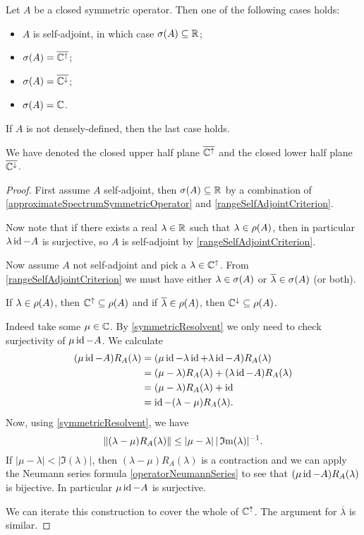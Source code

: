 \begin{proposition}
Let $A$ be a closed symmetric operator. Then one of the following cases holds:
\begin{itemize}
\item $A$ is self-adjoint, in which case $\sigma(A) \subseteq \mathbb{R}$;
\item $\sigma(A) = \overline{\mathbb{C}^{\uparrow}}$;
\item $\sigma(A) = \overline{\mathbb{C}^{\downarrow}}$;
\item $\sigma(A) = \mathbb{C}$.
\end{itemize}
If $A$ is not densely-defined, then the last case holds.
\end{proposition}
We have denoted the closed upper half plane $\overline{\mathbb{C}^{\uparrow}}$ and the closed lower half plane $\overline{\mathbb{C}^{\downarrow}}$.
\begin{proof}
First assume $A$ self-adjoint, then $\sigma(A)\subseteq \mathbb{R}$ by a combination of \ref{approximateSpectrumSymmetricOperator} and \ref{rangeSelfAdjointCriterion}.

Now note that if there exists a real $\lambda\in\mathbb{R}$ such that $\lambda \in \rho(A)$, then in particular $\lambda\operatorname{id} -A$ is surjective, so $A$ is self-adjoint by \ref{rangeSelfAdjointCriterion}.

Now assume $A$ not self-adjoint and pick a $\lambda\in \mathbb{C}^{\uparrow}$. From \ref{rangeSelfAdjointCriterion} we must have either $\lambda\in\sigma(A)$ or $\overline{\lambda}\in\sigma(A)$ (or both).

If $\lambda\in \rho(A)$, then $\mathbb{C}^\uparrow \subseteq \rho(A)$ and if $\overline{\lambda}\in\rho(A)$, then $\mathbb{C}^\downarrow \subseteq \rho(A)$.

Indeed take some $\mu\in\mathbb{C}$.
By \ref{symmetricResolvent} we only need to check surjectivity of $\mu\operatorname{id} - A$. We calculate
\begin{align*}
(\mu\operatorname{id} - A)R_A(\lambda) &= (\mu\operatorname{id} -\lambda\operatorname{id}+\lambda\operatorname{id} - A)R_A(\lambda) \\
&= (\mu-\lambda)R_A(\lambda) + (\lambda\operatorname{id}-A)R_A(\lambda) \\
&= (\mu-\lambda)R_A(\lambda) + \operatorname{id} \\
&= \operatorname{id} - (\lambda-\mu)R_A(\lambda).
\end{align*}
Now, using \ref{symmetricResolvent}, we have
\[ \lVert(\lambda-\mu)R_A(\lambda)\rVert \leq |\mu-\lambda| \, |\operatorname{\mathfrak{I}m}(\lambda)|^{-1}. \]
If $|\mu-\lambda| < |\Im(\lambda)|$, then $(\lambda-\mu)R_A(\lambda)$ is a contraction and we can apply the Neumann series formula \ref{operatorNeumannSeries} to see that $(\mu\operatorname{id} - A)R_A(\lambda)$ is bijective. In particular $\mu\operatorname{id} - A$ is surjective.

We can iterate this construction to cover the whole of $\mathbb{C}^\uparrow$. The argument for $\overline{\lambda}$ is similar.
\end{proof}

